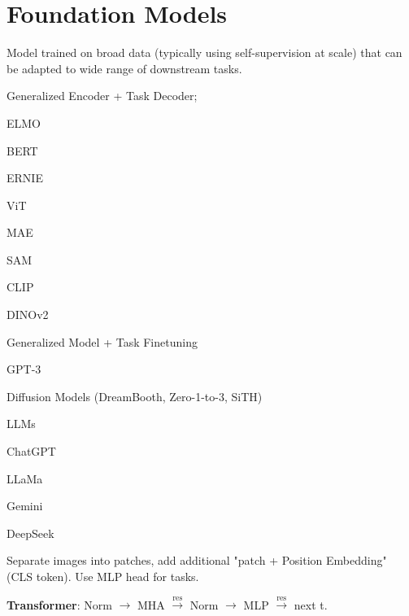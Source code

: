 \section{Foundation Models}
Model trained on broad data (typically using self-supervision at scale) that can be adapted to wide range of downstream tasks. 

\begin{definition}
    Generalized Encoder + Task Decoder;
    {\color{H1}
    \begin{itemize*}
        \item ELMO
        \item BERT
        \item ERNIE
    \end{itemize*}}
    {\color{H2}
    \begin{itemize*}
        \item ViT
        \item MAE
        \item SAM
        \item CLIP
        \item DINOv2
    \end{itemize*}}
\end{definition}

\begin{definition}
    Generalized Model + Task Finetuning
    {\color{H1}
    \begin{itemize*}
        \item GPT-3
    \end{itemize*}}
    {\color{H2}
    \begin{itemize*}
        \item Diffusion Models (DreamBooth, Zero-1-to-3, SiTH)
    \end{itemize*}}
\end{definition}

\begin{definition}
    LLMs
    {\color{H1}
    \begin{itemize*}
        \item ChatGPT
        \item LLaMa
        \item Gemini
        \item DeepSeek
    \end{itemize*}}
\end{definition}

\begin{definition}[ViT]
    Separate images into patches, add additional "patch + Position Embedding" (CLS token).
    Use MLP head for tasks.

    \textbf{Transformer}: Norm \(\to\) MHA \(\overset{\text{res}}{\to}\) Norm \(\to\) MLP \(\overset{\text{res}}{\to}\) next t.
\end{definition}

